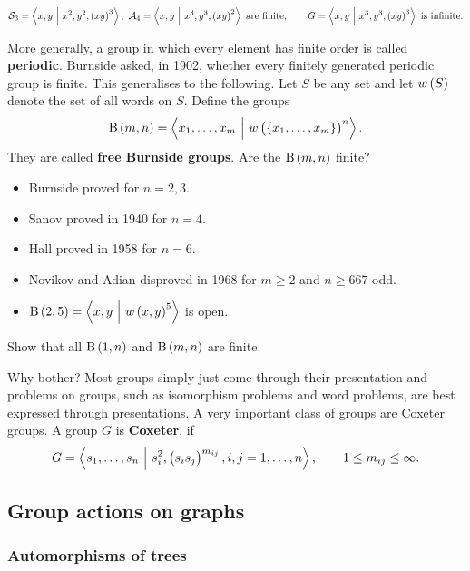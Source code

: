 \begin{example*}
$$ \SSS_3 = \abr{x, y \st x^2, y^2, \br{xy}^3}, \ \AAA_4 = \abr{x, y \st x^3, y^3, \br{xy}^2} \ \text{are finite}, \qquad G = \abr{x, y \st x^3, y^3, \br{xy}^3} \ \text{is infinite}. $$
\end{example*}

\pagebreak

\begin{remark}
More generally, a group in which every element has finite order is called \textbf{periodic}. Burnside asked, in 1902, whether every finitely generated periodic group is finite. This generalises to the following. Let $ S $ be any set and let $ w\br{S} $ denote the set of all words on $ S $. Define the groups
$$ \B\br{m, n} = \abr{x_1, \dots, x_m \st w\br{\cbr{x_1, \dots, x_m}}^n}. $$
They are called \textbf{free Burnside groups}. Are the $ \B\br{m, n} $ finite?
\begin{itemize}
\item Burnside proved for $ n = 2, 3 $.
\item Sanov proved in 1940 for $ n = 4 $.
\item Hall proved in 1958 for $ n = 6 $.
\item Novikov and Adian disproved in 1968 for $ m \ge 2 $ and $ n \ge 667 $ odd.
\item $ \B\br{2, 5} = \abr{x, y \st w\br{x, y}^5} $ is open.
\end{itemize}
\end{remark}

\begin{exercise}
Show that all $ \B\br{1, n} $ and $ \B\br{m, n} $ are finite.
\end{exercise}

Why bother? Most groups simply just come through their presentation and problems on groups, such as isomorphism problems and word problems, are best expressed through presentations. A very important class of groups are Coxeter groups. A group $ G $ is \textbf{Coxeter}, if
$$ G = \abr{s_1, \dots, s_n \st s_i^2, \br{s_is_j}^{m_{ij}}, i, j = 1, \dots, n}, \qquad 1 \le m_{ij} \le \infty. $$

\subsection{Group actions on graphs}

\subsubsection{Automorphisms of trees}

